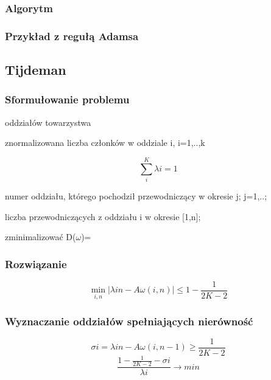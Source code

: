 \documentclass[12pt,a4paper]{article}
\begin{document}
\subsubsection{Algorytm}
\subsubsection{Przykład z regułą Adamsa}

\newpage
\subsection{Tijdeman}
\subsubsection{Sformułowanie problemu}
\begin{description}
\item[k] oddziałów towarzystwa
\item[$\lambda$i] znormalizowana liczba członków w oddziale i, i=1,..,k
\item \begin{equation}
\sum \limits_{i}^{K} \lambda i = 1
\end{equation}
\item[$\omega$i] numer oddziału, którego pochodził przewodniczący w okresie j; j=1,..;
\item[A$\omega$(i,n)] liczba przewodniczących z oddziału i w okresie [1,n]; 
\item zminimalizować D($\omega$)=
\end{description}

\subsubsection{Rozwiązanie}
\begin{equation}
\min\limits_{i,n}\left | \lambda in - A\omega(i,n)\right | \leq 1-\frac{1}{2K-2}
\end{equation}
\subsubsection{Wyznaczanie oddziałów spełniających nierówność}
\begin{equation}
\sigma i = \lambda in - A\omega (i,n-1) \geq \frac{1}{2K-2}
\end{equation}
\begin{equation}
\frac{1-\frac{1}{2K-2}-\sigma i}{\lambda i} \to min
\end{equation}
\end{document}
